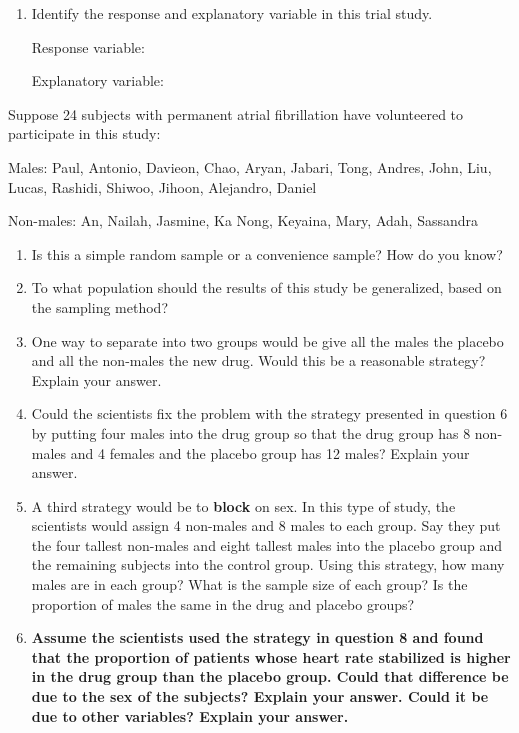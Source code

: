\documentclass[
]{report}
\begin{document}
\begin{enumerate}
\def\labelenumi{\arabic{enumi}.}
\setcounter{enumi}{2}
\item
  Identify the response and explanatory variable in this trial study.

  Response variable:
  \vspace{0.25in}

  Explanatory variable:
  \vspace{0.25in}
\end{enumerate}

\newpage

Suppose 24 subjects with permanent atrial fibrillation have volunteered to participate in this study:

Males: Paul, Antonio, Davieon, Chao, Aryan, Jabari, Tong, Andres, John, Liu, Lucas, Rashidi, Shiwoo, Jihoon, Alejandro, Daniel

Non-males: An, Nailah, Jasmine, Ka Nong, Keyaina, Mary, Adah, Sassandra

\begin{enumerate}
\def\labelenumi{\arabic{enumi}.}
\setcounter{enumi}{3}
\item
  Is this a simple random sample or a convenience sample? How do you know?
  \vspace{0.5in}
\item
  To what population should the results of this study be generalized, based on the sampling method?
  \vspace{0.5in}
\item
  One way to separate into two groups would be give all the males the placebo and all the non-males the new drug. Would this be a reasonable strategy? Explain your answer.
  \vspace{1in}
\item
  Could the scientists fix the problem with the strategy presented in question 6 by putting four males into the drug group so that the drug group has 8 non-males and 4 females and the placebo group has 12 males? Explain your answer.
  \vspace{0.5in}
\item
  A third strategy would be to \textbf{block} on sex. In this type of study, the scientists would assign 4 non-males and 8 males to each group. Say they put the four tallest non-males and eight tallest males into the placebo group and the remaining subjects into the control group. Using this strategy, how many males are in each group? What is the sample size of each group? Is the proportion of males the same in the drug and placebo groups?
  \vspace{0.5in}
\item
  \textbf{Assume the scientists used the strategy in question 8 and found that the proportion of patients whose heart rate stabilized is higher in the drug group than the placebo group. Could that difference be due to the sex of the subjects? Explain your answer. Could it be due to other variables? Explain your answer.}
  \vspace{1in}
\end{enumerate}
\end{document}

